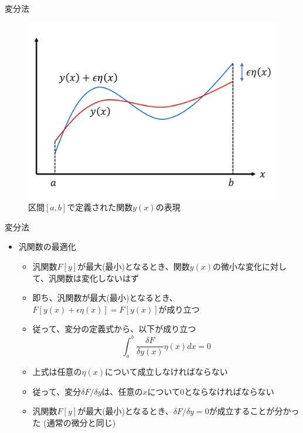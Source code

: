 \documentclass[dvipdfmx,notheorems,t]{beamer}
\begin{document}
\begin{frame}{変分法}

\begin{figure}[h]
	\centering
	\includegraphics[scale=0.28]{functional-derivative.pdf}
	\caption{区間$[a, b]$で定義された関数$y(x)$の表現}
	\label{fig:function-derivative-example}
\end{figure}

\end{frame}

\begin{frame}{変分法}

\begin{itemize}
	\item 汎関数の最適化
	\begin{itemize}
		\item 汎関数$F[y]$が最大(最小)となるとき、\color{red}関数$y(x)$の微小な変化に対して、汎関数は変化しないはず\normalcolor
		\item 即ち、汎関数が最大(最小)となるとき、$F[y(x) + \epsilon \eta(x)] = F[y(x)]$が成り立つ
		\item 従って、変分の定義式から、以下が成り立つ
		\begin{equation}
			\int_a^b \frac{\delta F}{\delta y(x)} \eta(x) dx = 0
		\end{equation}
		
		\item 上式は任意の$\eta(x)$について成立しなければならない
		\item 従って、変分$\delta F/\delta y$は、任意の$x$について$0$とならなければならない
		\newline
		\item 汎関数$F[y]$が最大(最小)となるとき、\color{red}$\delta F/\delta y = 0$\normalcolor が成立することが分かった (\alert{通常の微分と同じ})
	\end{itemize}
\end{itemize}

\end{frame}
\end{document}
